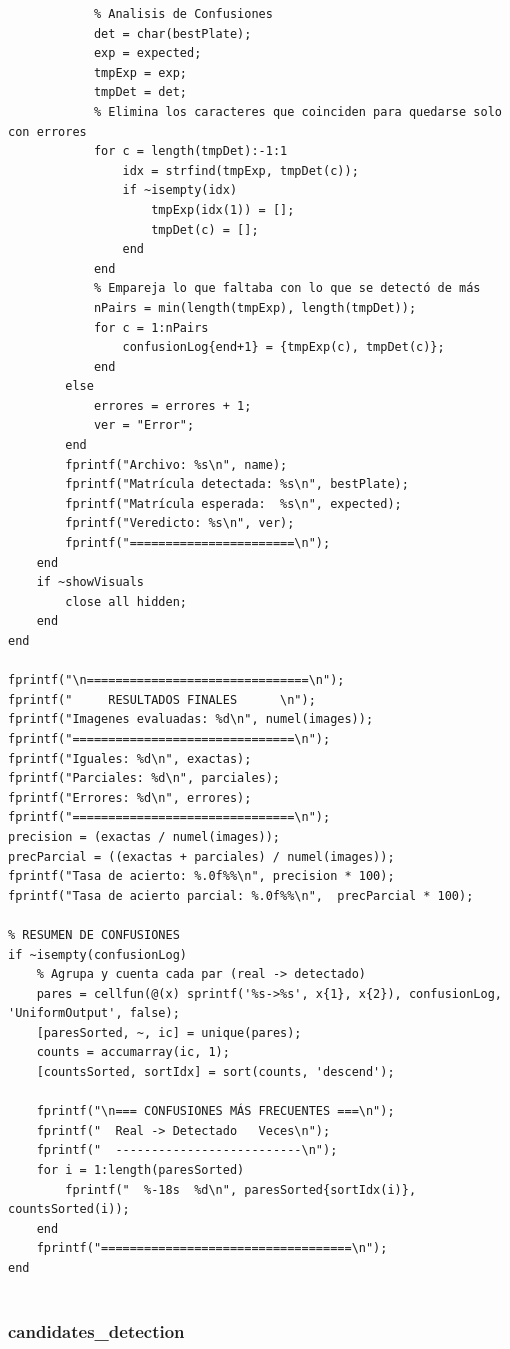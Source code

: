 \begin{verbatim}
            % Analisis de Confusiones
            det = char(bestPlate);
            exp = expected;
            tmpExp = exp;
            tmpDet = det;
            % Elimina los caracteres que coinciden para quedarse solo con errores
            for c = length(tmpDet):-1:1
                idx = strfind(tmpExp, tmpDet(c));
                if ~isempty(idx)
                    tmpExp(idx(1)) = [];
                    tmpDet(c) = [];
                end
            end
            % Empareja lo que faltaba con lo que se detectó de más
            nPairs = min(length(tmpExp), length(tmpDet));
            for c = 1:nPairs
                confusionLog{end+1} = {tmpExp(c), tmpDet(c)};
            end
        else
            errores = errores + 1;
            ver = "Error";
        end
        fprintf("Archivo: %s\n", name);
        fprintf("Matrícula detectada: %s\n", bestPlate);
        fprintf("Matrícula esperada:  %s\n", expected);
        fprintf("Veredicto: %s\n", ver);
        fprintf("=======================\n");
    end
    if ~showVisuals
        close all hidden;
    end
end

fprintf("\n===============================\n");
fprintf("     RESULTADOS FINALES      \n");
fprintf("Imagenes evaluadas: %d\n", numel(images));
fprintf("===============================\n");
fprintf("Iguales: %d\n", exactas);
fprintf("Parciales: %d\n", parciales);
fprintf("Errores: %d\n", errores);
fprintf("===============================\n");
precision = (exactas / numel(images));
precParcial = ((exactas + parciales) / numel(images));
fprintf("Tasa de acierto: %.0f%%\n", precision * 100);
fprintf("Tasa de acierto parcial: %.0f%%\n",  precParcial * 100);

% RESUMEN DE CONFUSIONES 
if ~isempty(confusionLog)
    % Agrupa y cuenta cada par (real -> detectado)
    pares = cellfun(@(x) sprintf('%s->%s', x{1}, x{2}), confusionLog, 'UniformOutput', false);
    [paresSorted, ~, ic] = unique(pares);
    counts = accumarray(ic, 1);
    [countsSorted, sortIdx] = sort(counts, 'descend');

    fprintf("\n=== CONFUSIONES MÁS FRECUENTES ===\n");
    fprintf("  Real -> Detectado   Veces\n");
    fprintf("  --------------------------\n");
    for i = 1:length(paresSorted)
        fprintf("  %-18s  %d\n", paresSorted{sortIdx(i)}, countsSorted(i));
    end
    fprintf("===================================\n");
end
    
\end{verbatim}

\subsubsection{candidates\_detection}

